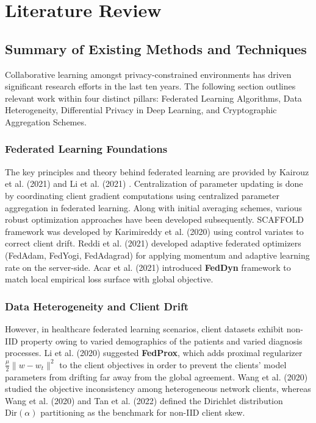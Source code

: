 \documentclass[12pt,a4paper]{report}
\begin{document}
\chapter{Literature Review}
\label{chap:lit_review}

\section{Summary of Existing Methods and Techniques}
Collaborative learning amongst privacy-constrained environments has driven significant research efforts in the last ten years. The following section outlines relevant work within four distinct pillars: Federated Learning Algorithms, Data Heterogeneity, Differential Privacy in Deep Learning, and Cryptographic Aggregation Schemes.

\subsection{Federated Learning Foundations}
The key principles and theory behind federated learning are provided by Kairouz et al. (2021) \cite{kairouz2021advances} and Li et al. (2021) \cite{li2021survey}. Centralization of parameter updating is done by coordinating client gradient computations using centralized parameter aggregation in federated learning. Along with initial averaging schemes, various robust optimization approaches have been developed subsequently. SCAFFOLD framework was developed by Karimireddy et al. (2020) \cite{karimireddy2020scaffold} using control variates to correct client drift. Reddi et al. (2021) \cite{reddi2021adaptive} developed adaptive federated optimizers (FedAdam, FedYogi, FedAdagrad) for applying momentum and adaptive learning rate on the server-side. Acar et al. (2021) \cite{acar2021feddyn} introduced \textbf{FedDyn} framework to match local empirical loss surface with global objective.

\subsection{Data Heterogeneity and Client Drift}
However, in healthcare federated learning scenarios, client datasets exhibit non-IID property owing to varied demographics of the patients and varied diagnosis processes. Li et al. (2020) \cite{li2020fedprox} suggested \textbf{FedProx}, which adds proximal regularizer $\frac{\mu}{2}\|w - w_t\|^2$ to the client objectives in order to prevent the clients' model parameters from drifting far away from the global agreement. Wang et al. (2020) \cite{wang2020fednova} studied the objective inconsistency among heterogeneous network clients, whereas Wang et al. (2020) \cite{wang2020fedma} and Tan et al. (2022) \cite{tan2022survey} defined the Dirichlet distribution $\text{Dir}(\alpha)$ partitioning as the benchmark for non-IID client skew.
\end{document}
